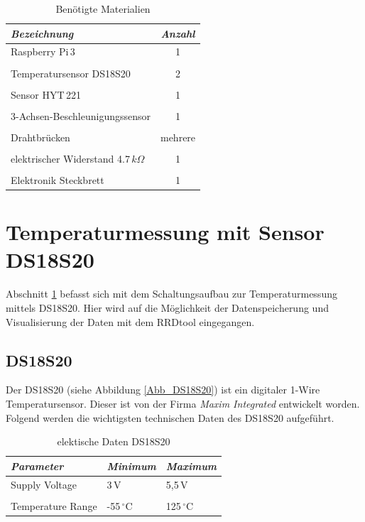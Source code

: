 \begin{table}[H]
\centering
\begin{tabular}{
lc
}
\toprule
\multicolumn{1}{p{6cm}}{\textit{Bezeichnung}} & \multicolumn{1}{p{3.5cm}}{\centering\textit{Anzahl} } \\\midrule
Raspberry Pi\,3& 1 \\
&\\
Temperatursensor DS18S20 & 2 \\
&\\
Sensor HYT\,221 & 1\\
&\\
3-Achsen-Beschleunigungssensor & 1\\
&\\
Drahtbrücken & mehrere\\
&\\
elektrischer Widerstand 4.7\,$k\Omega$ & 1\\
&\\
Elektronik Steckbrett & 1\\
\bottomrule
\end{tabular}
\caption{Benötigte Materialien}
\label{Tabelle_benötigte_Materialien}
\end{table}

\section{Temperaturmessung mit Sensor DS18S20}
\label{section_DS18S20}
Abschnitt \ref{section_DS18S20} befasst sich mit dem Schaltungsaufbau zur Temperaturmessung mittels DS18S20. Hier wird auf die Möglichkeit der Datenspeicherung und Visualisierung der Daten mit dem RRDtool eingegangen.
 

\subsection{DS18S20}
\label{subsection_DS18S20}
Der DS18S20 (siehe Abbildung \ref{Abb_DS18S20}) ist ein digitaler 1-Wire Temperatursensor. Dieser ist von der Firma \textit{Maxim Integrated} entwickelt worden.
Folgend werden die wichtigsten technischen Daten des DS18S20 aufgeführt.

\begin{table}[H]
\centering
\begin{tabular}{
lll
}
\toprule

\multicolumn{1}{p{5.5cm}}{\textit{Parameter}} & \multicolumn{1}{p{3cm}}{\textit{Minimum} }&\multicolumn{1}{p{3cm}}{\textit{Maximum}}\\\midrule
Supply Voltage & 3\,V & 5,5\,V\\
&&\\
Temperature Range & -55\,$^\circ$C & 125\,$^\circ$C\\
\bottomrule
\end{tabular}
\caption{elektische Daten DS18S20  \citep{Datenblatt_DB18S20}}
\label{Tabelle_Elektrische_Daten_DS18S20}
\end{table}



